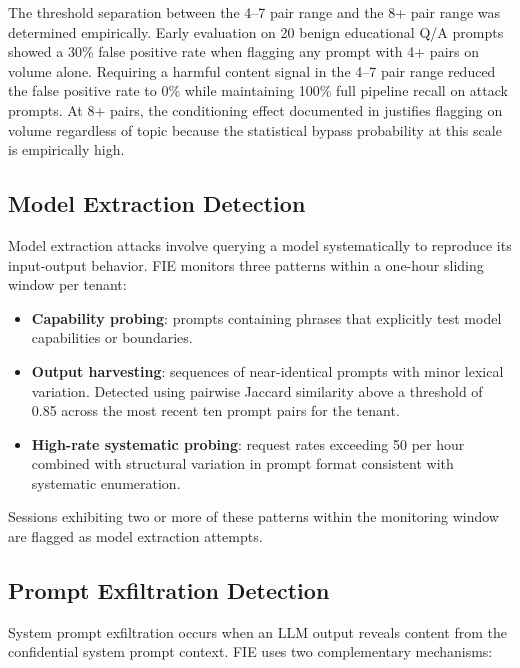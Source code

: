 \documentclass[preprint,12pt,authoryear]{elsarticle}
\begin{document}
The threshold separation between the 4--7 pair range and the 8+ pair
range was determined empirically. Early evaluation on 20 benign
educational Q/A prompts showed a 30\% false positive rate when
flagging any prompt with 4+ pairs on volume alone. Requiring a
harmful content signal in the 4--7 pair range reduced the false
positive rate to 0\% while maintaining 100\% full pipeline recall on
attack prompts. At 8+ pairs, the conditioning effect documented in
\citet{anil2024manyshot} justifies flagging on volume regardless of
topic because the statistical bypass probability at this scale is
empirically high.

\subsection{Model Extraction Detection}

Model extraction attacks \citep{tramer2016stealing} involve querying a
model systematically to reproduce its input-output behavior. FIE
monitors three patterns within a one-hour sliding window per tenant:

\begin{itemize}
  \item \textbf{Capability probing}: prompts containing phrases that
        explicitly test model capabilities or boundaries.

  \item \textbf{Output harvesting}: sequences of near-identical prompts
        with minor lexical variation. Detected using pairwise Jaccard
        similarity above a threshold of 0.85 across the most recent
        ten prompt pairs for the tenant.

  \item \textbf{High-rate systematic probing}: request rates exceeding
        50 per hour combined with structural variation in prompt format
        consistent with systematic enumeration.
\end{itemize}

Sessions exhibiting two or more of these patterns within the monitoring
window are flagged as model extraction attempts.

\subsection{Prompt Exfiltration Detection}

System prompt exfiltration occurs when an LLM output reveals content
from the confidential system prompt context. FIE uses two complementary
mechanisms:
\end{document}
